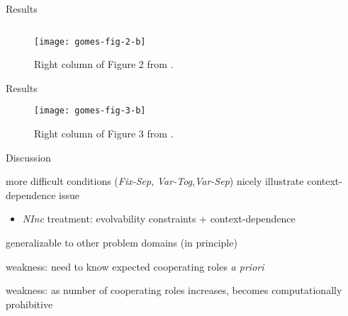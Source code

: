 \begin{frame}{Results}

\begin{figure}
\begin{columns}
\begin{column}{0.5\textwidth}
\texttt{[image: gomes-fig-2-b]}
\end{column}
\begin{column}{0.5\textwidth}
\caption{
Right column of Figure 2 from \cite{gomes2015cooperative}.
}
\end{column}
\end{columns}
\end{figure}

\end{frame}

\begin{frame}{Results}

\begin{figure}

\texttt{[image: gomes-fig-3-b]}

\caption{
Right column of Figure 3 from \cite{gomes2015cooperative}.
}

\end{figure}

\end{frame}

\begin{frame}{Discussion}

more difficult conditions (\textit{Fix-Sep}, \textit{Var-Tog},\textit{Var-Sep}) nicely illustrate context-dependence issue
\begin{itemize}
\item \textit{NInc} treatment: evolvability constraints + context-dependence
\end{itemize}

generalizable to other problem domains (in principle)

weakness: need to know expected cooperating roles \textit{a priori}

weakness: as number of cooperating roles increases, becomes computationally prohibitive

\end{frame}

